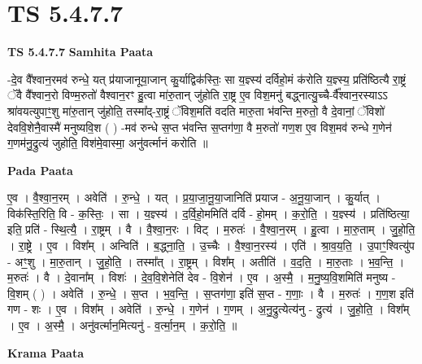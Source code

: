 \documentclass[17pt]{extarticle}
\begin{document}
\section{ TS 5.4.7.7 }

\textbf{TS 5.4.7.7 } \newline
\textbf{Samhita Paata} \newline

-दे॒व वै᳚श्वान॒रमव॑ रुन्धे॒ यत् प्र॑याजानूया॒जान् कु॒र्याद्विक॑स्तिः॒ सा य॒ज्ञ्स्य॑ दर्विहो॒मं क॑रोति य॒ज्ञ्स्य॒ प्रति॑ष्ठित्यै रा॒ष्ट्रं ॅवै वै᳚श्वान॒रो विण्म॒रुतो॑ वैश्वान॒रꣳ हु॒त्वा मा॑रु॒तान् जु॑होति रा॒ष्ट्र ए॒व विश॒मनु॑ बद्ध्नात्यु॒च्चै-र्वै᳚श्वान॒रस्याऽऽ श्रा॑वयत्युपाꣳ॒॒शु मा॑रु॒तान् जु॑होति॒ तस्मा᳚द्-रा॒ष्ट्रं ॅविश॒मति॑ वदति मारु॒ता भ॑वन्ति म॒रुतो॒ वै दे॒वानां॒ ॅविशो॑ देववि॒शेनै॒वास्मै॑ मनुष्यवि॒श ( ) -मव॑ रुन्धे स॒प्त भ॑वन्ति स॒प्तग॑णा॒ वै म॒रुतो॑ गण॒श ए॒व विश॒मव॑ रुन्धे ग॒णेन॑ ग॒णम॑नु॒द्रुत्य॑ जुहोति॒ विश॑मे॒वास्मा॒ अनु॑वर्त्मानं करोति ॥ \newline

\textbf{Pada Paata} \newline

ए॒व । वै॒श्वा॒न॒रम् । अवेति॑ । रु॒न्धे॒ । यत् । प्र॒या॒जा॒नू॒या॒जानिति॑ प्रयाज - अ॒नू॒या॒जान् । कु॒र्यात् । विक॑स्ति॒रिति॒ वि - क॒स्तिः॒ । सा । य॒ज्ञ्स्य॑ । द॒र्वि॒हो॒ममिति॑ दर्वि - हो॒मम् । क॒रो॒ति॒ । य॒ज्ञ्स्य॑ । प्रति॑ष्ठित्या॒ इति॒ प्रति॑ - स्थि॒त्यै॒ । रा॒ष्ट्रम् । वै । वै॒श्वा॒न॒रः । विट् । म॒रुतः॑ । वै॒श्वा॒न॒रम् । हु॒त्वा । मा॒रु॒ताम् । जु॒हो॒ति॒ । रा॒ष्ट्रे । ए॒व । विश᳚म् । अन्विति॑ । ब॒द्ध्ना॒ति॒ । उ॒च्चैः । वै॒श्वा॒न॒रस्य॑ । एति॑ । श्रा॒व॒य॒ति॒ । उ॒पाꣳ॒॒श्वित्यु॑प - अꣳ॒॒शु । मा॒रु॒तान् । जु॒हो॒ति॒ । तस्मा᳚त् । रा॒ष्ट्रम् । विश᳚म् । अतीति॑ । व॒द॒ति॒ । मा॒रु॒ताः । भ॒व॒न्ति॒ । म॒रुतः॑ । वै । दे॒वाना᳚म् । विशः॑ । दे॒व॒वि॒शेनेति॑ देव - वि॒शेन॑ । ए॒व । अ॒स्मै॒ । म॒नु॒ष्य॒वि॒शमिति॑ मनुष्य - वि॒शम् ( ) । अवेति॑ । रु॒न्धे॒ । स॒प्त । भ॒व॒न्ति॒ । स॒प्तग॑णा॒ इति॑ स॒प्त - ग॒णाः॒ । वै । म॒रुतः॑ । ग॒ण॒श इति॑ गण - शः । ए॒व । विश᳚म् । अवेति॑ । रु॒न्धे॒ । ग॒णेन॑ । ग॒णम् । अ॒नु॒द्रुत्येत्य॑नु - द्रुत्य॑ । जु॒हो॒ति॒ । विश᳚म् । ए॒व । अ॒स्मै॒ । अनु॑वर्त्मान॒मित्यनु॑ - व॒र्त्मा॒न॒म् । क॒रो॒ति॒ ॥  \newline


\textbf{Krama Paata} \newline
\end{document}
